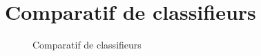 \section{Comparatif de classifieurs \citep{scikit-learn}}
\begin{figure}[H]
	\centering
	\caption{Comparatif de classifieurs \citep{scikit-learn}}
	\label{comp_clf}
\end{figure}



